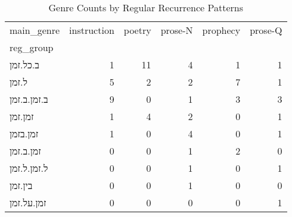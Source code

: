 \begin{table}[htbp!]
\centering
\caption{Genre Counts by Regular Recurrence Patterns}
\label{table:regroup_gen_ct}
\begin{tabular}{lrrrrr}
\toprule
main\_genre &  instruction &  poetry &  prose-N &  prophecy &  prose-Q \\
reg\_group   &              &         &          &           &          \\
\midrule
ב.כל.זמן    &            1 &      11 &        4 &         1 &        1 \\
ל.זמן       &            5 &       2 &        2 &         7 &        1 \\
ב.זמן.ב.זמן &            9 &       0 &        1 &         3 &        3 \\
זמן.זמן     &            1 &       4 &        2 &         0 &        1 \\
זמן.בזמן    &            1 &       0 &        4 &         0 &        1 \\
זמן.ב.זמן   &            0 &       0 &        1 &         2 &        0 \\
ל.זמן.ל.זמן &            0 &       0 &        1 &         0 &        1 \\
בין.זמן     &            0 &       0 &        1 &         0 &        0 \\
זמן.על.זמן  &            0 &       0 &        0 &         0 &        1 \\
\bottomrule
\end{tabular}
\end{table}
